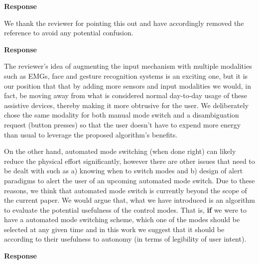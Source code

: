 \documentclass[a4paper,twoside,11pt]{reviewresponse}
\begin{document}

\textbf{Response}

We thank the reviewer for pointing this out and have accordingly removed the reference to avoid any potential confusion. 


\textbf{Response}

The reviewer's idea of augmenting the input mechanism with multiple modalities such as EMGs, face and gesture recognition systems is an exciting one, but it is our position that that by adding more sensors and input modalities we would, in fact, be moving away from what is considered normal day-to-day usage of these assistive devices, thereby making it more obtrusive for the user. We deliberately chose the same modality for both manual mode switch and a disambiguation request (button presses) so that the user doesn't have to expend more energy than usual to leverage the proposed algorithm's benefits. 

On the other hand, automated mode switching (when done right) can likely reduce the physical effort significantly, however there are other issues that need to be dealt with such as a) knowing when to switch modes and b) design of alert paradigms to alert the user of an upcoming automated mode switch. Due to these reasons, we think that automated mode switch is currently beyond the scope of the current paper. We would argue that, what we have introduced is an algorithm to evaluate the potential usefulness of the control modes. That is, \textbf{if} we were to have a automated mode switching scheme, which one of the modes should be selected at any given time and in this work we suggest that it should be according to their usefulness to autonomy (in terms of legibility of user intent).


\textbf{Response}
\end{document}
